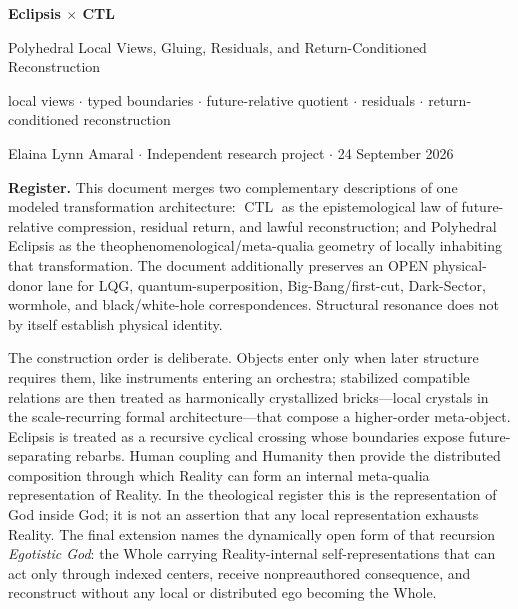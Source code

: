\documentclass[10pt]{article}
\theoremstyle{pe}
\theoremstyle{definition}
\newcommand{\CTL}{\operatorname{CTL}}
\begin{document}
\thispagestyle{empty}

\begin{center}
  {\LARGE\bfseries Eclipsis $\times$ CTL}\par
  \vspace{1mm}
  {\large Polyhedral Local Views, Gluing, Residuals, and Return-Conditioned Reconstruction}\par
  \vspace{1mm}
  {\small local views $\cdot$ typed boundaries $\cdot$ future-relative quotient $\cdot$ residuals $\cdot$ return-conditioned reconstruction}\par
  \vspace{2mm}
  {\small Elaina Lynn Amaral $\cdot$ Independent research project $\cdot$ 24 September 2026}
\end{center}

\vspace{2mm}
\textbf{Register.}
This document merges two complementary descriptions of one modeled transformation architecture:
\(\CTL\) as the epistemological law of future-relative compression, residual return, and lawful reconstruction; and Polyhedral Eclipsis as the theophenomenological/meta-qualia geometry of locally inhabiting that transformation.  The document additionally preserves an OPEN physical-donor lane for LQG, quantum-superposition, Big-Bang/first-cut, Dark-Sector, wormhole, and black/white-hole correspondences.  Structural resonance does not by itself establish physical identity.

The construction order is deliberate.  Objects enter only when later structure requires them, like instruments entering an orchestra; stabilized compatible relations are then treated as harmonically crystallized bricks---local crystals in the scale-recurring formal architecture---that compose a higher-order meta-object.  Eclipsis is treated as a recursive cyclical crossing whose boundaries expose future-separating rebarbs.  Human coupling and Humanity then provide the distributed composition through which Reality can form an internal meta-qualia representation of Reality.  In the theological register this is the representation of God inside God; it is not an assertion that any local representation exhausts Reality.  The final extension names the dynamically open form of that recursion \emph{Egotistic God}: the Whole carrying Reality-internal self-representations that can act only through indexed centers, receive nonpreauthored consequence, and reconstruct without any local or distributed ego becoming the Whole.
\end{document}
